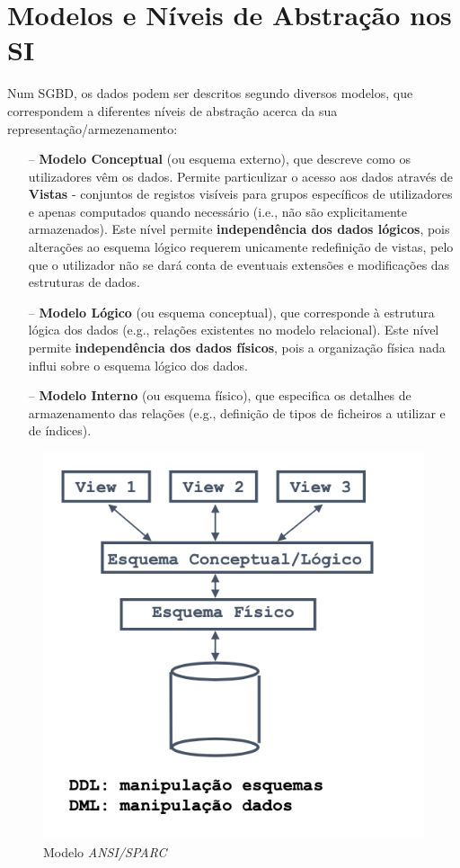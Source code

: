 \documentclass[titlepage]{book}
\theoremstyle{definition}
\begin{document}
\section{Modelos e Níveis de Abstração nos SI}

Num SGBD, os dados podem ser descritos segundo diversos modelos, que correspondem a diferentes níveis de abstração acerca da sua representação/armezenamento:
\begin{itemize}
    \itemsep0cm
    \item[--]\textbf{Modelo Conceptual} (ou esquema externo), que descreve como os utilizadores vêm os dados. Permite particulizar o acesso aos dados através de \textbf{Vistas} - conjuntos de registos visíveis para grupos específicos de utilizadores e apenas computados quando necessário (i.e., não são explicitamente armazenados). Este nível permite \textbf{independência dos dados lógicos}, pois alterações ao esquema lógico requerem unicamente redefinição de vistas, pelo que o utilizador não se dará conta de eventuais extensões e modificações das estruturas de dados.
    \item[--]\textbf{Modelo Lógico} (ou esquema conceptual), que corresponde à estrutura lógica dos dados (e.g., relações existentes no modelo relacional). Este nível permite \textbf{independência dos dados físicos}, pois a organização física nada influi sobre o esquema lógico dos dados.
    \item[--]\textbf{Modelo Interno} (ou esquema físico), que especifica os detalhes de armazenamento das relações (e.g., definição de tipos de ficheiros a utilizar e de índices). 
\end{itemize}
\begin{figure}[H]
    \centering
    \includegraphics[scale = 0.6]{cap1/modelo_ansi.png}
    \caption{Modelo \textit{ANSI/SPARC}}
\end{figure}
\end{document}
